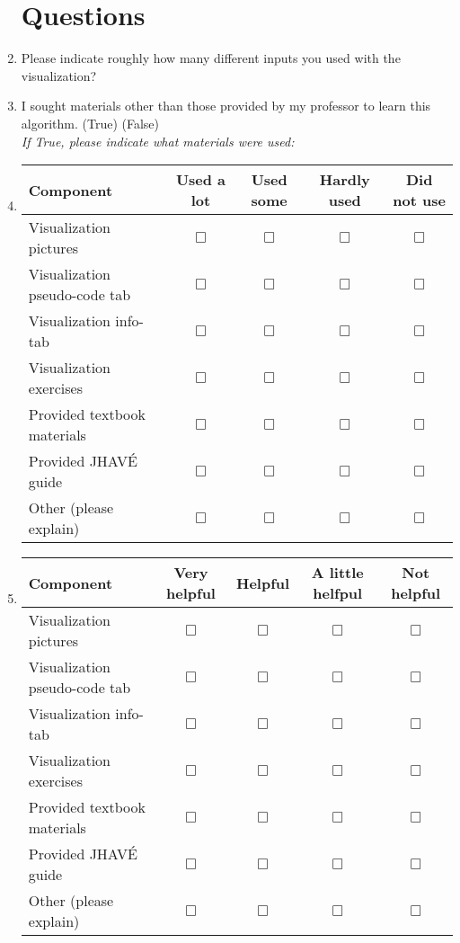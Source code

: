 \documentclass[letter]{article}
\begin{document}
\begin{enumerate}

\section*{Questions}

\item Please indicate roughly how many different inputs you used with the visualization? \underline{\hspace{1cm}}

\item I sought materials other than those provided by my professor to learn this algorithm.
(True) (False) \\ \textsl{If True, please indicate what materials were used:}


\item
\begin{tabular}{| l | c | c | c | c |}
\hline
\textbf{Component} & \textbf{Used a lot} & \textbf{Used some} & \textbf{Hardly used} & \textbf{Did not use} \\
\hline
Visualization pictures & $\Box$ & $\Box$ & $\Box$ & $\Box$ \\
\hline
Visualization pseudo-code tab & $\Box$ & $\Box$ & $\Box$ & $\Box$ \\
\hline
Visualization info-tab & $\Box$ & $\Box$ & $\Box$ & $\Box$ \\
\hline
Visualization exercises & $\Box$ & $\Box$ & $\Box$ & $\Box$ \\
\hline
Provided textbook materials & $\Box$ & $\Box$ & $\Box$ & $\Box$ \\
\hline
Provided JHAVÉ guide & $\Box$ & $\Box$ & $\Box$ & $\Box$ \\
\hline
Other (please explain) & $\Box$ & $\Box$ & $\Box$ & $\Box$ \\
\hline
\end{tabular}

\item
\begin{tabular}{| l | c | c | c | c |}
\hline
\textbf{Component} & \textbf{Very helpful} & \textbf{Helpful} & \textbf{A little helfpul} & \textbf{Not helpful} \\
\hline
Visualization pictures & $\Box$ & $\Box$ & $\Box$ & $\Box$ \\
\hline
Visualization pseudo-code tab & $\Box$ & $\Box$ & $\Box$ & $\Box$ \\
\hline
Visualization info-tab & $\Box$ & $\Box$ & $\Box$ & $\Box$ \\
\hline
Visualization exercises & $\Box$ & $\Box$ & $\Box$ & $\Box$ \\
\hline
Provided textbook materials & $\Box$ & $\Box$ & $\Box$ & $\Box$ \\
\hline
Provided JHAVÉ guide & $\Box$ & $\Box$ & $\Box$ & $\Box$ \\
\hline
Other (please explain) & $\Box$ & $\Box$ & $\Box$ & $\Box$ \\
\hline
\end{tabular}


\end{enumerate}
\end{document}
